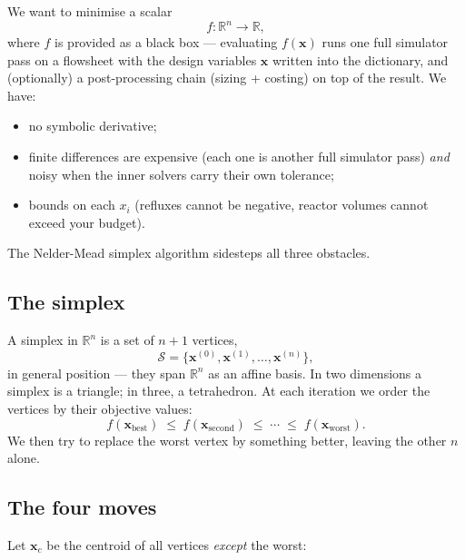 \documentclass[11pt,a4paper]{article}
\newcommand{\xv}{\mathbf{x}}
\begin{document}
We want to minimise a scalar
\[
    f : \mathbb R^n \longrightarrow \mathbb R,
\]
where $f$ is provided as a black box --- evaluating $f(\xv)$ runs one
full simulator pass on a flowsheet with the design variables $\xv$
written into the dictionary, and (optionally) a post-processing chain
(sizing + costing) on top of the result.  We have:
\begin{itemize}
    \item no symbolic derivative;
    \item finite differences are expensive (each one is another full
          simulator pass) \emph{and} noisy when the inner solvers carry
          their own tolerance;
    \item bounds on each $x_i$ (refluxes cannot be negative, reactor
          volumes cannot exceed your budget).
\end{itemize}
The Nelder-Mead simplex algorithm \cite{NelderMead1965} sidesteps all
three obstacles.

\subsection*{The simplex}

A simplex in $\mathbb R^n$ is a set of $n+1$ vertices,
\[
    \mathcal S = \{\xv^{(0)}, \xv^{(1)}, \ldots, \xv^{(n)}\},
\]
in general position --- they span $\mathbb R^n$ as an affine basis.  In
two dimensions a simplex is a triangle; in three, a tetrahedron.  At
each iteration we order the vertices by their objective values:
\[
    f(\xv_{\mathrm{best}})
    \;\le\; f(\xv_{\mathrm{second}})
    \;\le\; \cdots
    \;\le\; f(\xv_{\mathrm{worst}}).
\]
We then try to replace the worst vertex by something better, leaving
the other $n$ alone.

\subsection*{The four moves}

Let $\xv_c$ be the centroid of all vertices \emph{except} the worst:
\end{document}
